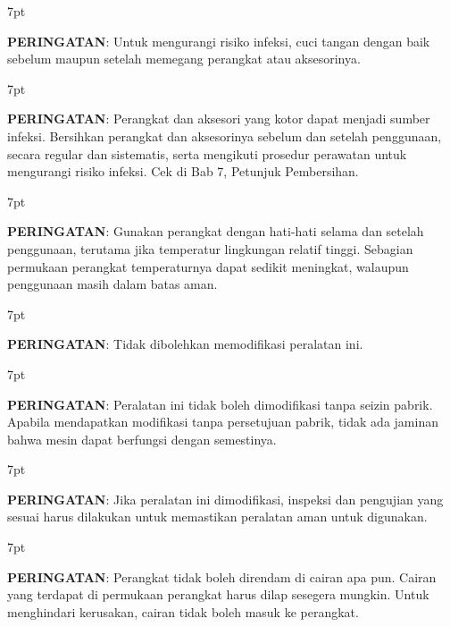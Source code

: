 \documentclass[11pt,a4paper,twoside,onecolumn]{book}
\newenvironment{formalred}{%
	\def\FrameCommand{%
		\hspace{1pt}%
		{\color{red}\vrule width 2pt}%
		{\color{formalshade}\vrule width 4pt}%
		\colorbox{formalshade}%
	}%
	\MakeFramed{\advance\hsize-\width\FrameRestore}%
	\noindent\hspace{-4.55pt}%
	\begin{adjustwidth}{}{7pt}%
		\vspace{2pt}\vspace{2pt}%
	}
	{%
		\vspace{2pt}\end{adjustwidth}\endMakeFramed%
}
\begin{document}
				\begin{formalred}
					\raisebox{0.125ex}{\resizebox{!}{2ex}{\danger}} \textbf{PERINGATAN}: 
					Untuk mengurangi risiko infeksi, cuci tangan dengan baik sebelum maupun setelah memegang perangkat atau aksesorinya.
				\end{formalred}
			
				\begin{formalred}
					\raisebox{0.125ex}{\resizebox{!}{2ex}{\danger}} \textbf{PERINGATAN}: 
					Perangkat dan aksesori yang kotor dapat menjadi sumber infeksi. Bersihkan perangkat dan aksesorinya sebelum dan setelah penggunaan, secara regular dan sistematis, serta mengikuti prosedur perawatan untuk mengurangi risiko infeksi. Cek di Bab 7, Petunjuk Pembersihan.
				\end{formalred}
			
				\begin{formalred}
					\raisebox{0.125ex}{\resizebox{!}{2ex}{\danger}} \textbf{PERINGATAN}: 
					Gunakan perangkat dengan hati-hati selama dan setelah penggunaan, terutama jika temperatur lingkungan relatif tinggi. Sebagian permukaan perangkat temperaturnya dapat sedikit meningkat, walaupun penggunaan masih dalam batas aman.
				\end{formalred}
			
				\begin{formalred}
					\raisebox{0.125ex}{\resizebox{!}{2ex}{\danger}} \textbf{PERINGATAN}: 
					Tidak dibolehkan memodifikasi peralatan ini.
				\end{formalred}
			
				\begin{formalred}
					\raisebox{0.125ex}{\resizebox{!}{2ex}{\danger}} \textbf{PERINGATAN}: 
					Peralatan ini tidak boleh dimodifikasi tanpa seizin pabrik. Apabila mendapatkan modifikasi tanpa persetujuan pabrik, tidak ada jaminan bahwa mesin dapat berfungsi dengan semestinya.
				\end{formalred}
			
				\begin{formalred}
					\raisebox{0.125ex}{\resizebox{!}{2ex}{\danger}} \textbf{PERINGATAN}: 
					Jika peralatan ini dimodifikasi, inspeksi dan pengujian yang sesuai harus dilakukan untuk memastikan peralatan aman untuk digunakan.
				\end{formalred}
			
				\begin{formalred}
					\raisebox{0.125ex}{\resizebox{!}{2ex}{\danger}} \textbf{PERINGATAN}: 
					Perangkat tidak boleh direndam di cairan apa pun. Cairan yang terdapat di permukaan perangkat harus dilap sesegera mungkin. Untuk menghindari kerusakan, cairan tidak boleh masuk ke perangkat.
				\end{formalred}
			
\end{document}
